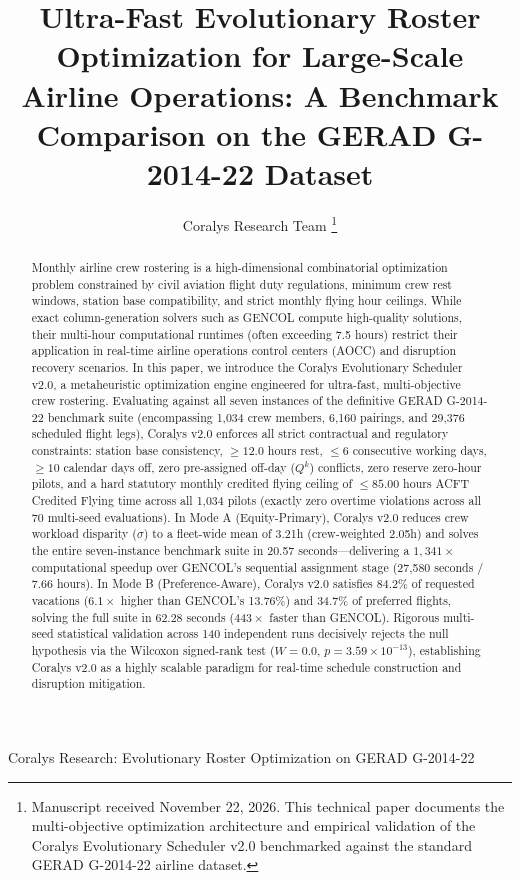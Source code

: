 \documentclass[journal]{IEEEtran}
\begin{document}
\title{Ultra-Fast Evolutionary Roster Optimization for Large-Scale Airline Operations: A Benchmark Comparison on the GERAD G-2014-22 Dataset}

\author{Coralys Research Team%
\thanks{Manuscript received November 22, 2026. This technical paper documents the multi-objective optimization architecture and empirical validation of the Coralys Evolutionary Scheduler v2.0 benchmarked against the standard GERAD G-2014-22 airline dataset.}}

%
{Coralys Research: Evolutionary Roster Optimization on GERAD G-2014-22}

\maketitle

\begin{abstract}
Monthly airline crew rostering is a high-dimensional combinatorial optimization problem constrained by civil aviation flight duty regulations, minimum crew rest windows, station base compatibility, and strict monthly flying hour ceilings. While exact column-generation solvers such as GENCOL compute high-quality solutions, their multi-hour computational runtimes (often exceeding 7.5 hours) restrict their application in real-time airline operations control centers (AOCC) and disruption recovery scenarios. In this paper, we introduce the Coralys Evolutionary Scheduler v2.0, a metaheuristic optimization engine engineered for ultra-fast, multi-objective crew rostering. Evaluating against all seven instances of the definitive GERAD G-2014-22 benchmark suite (encompassing 1,034 crew members, 6,160 pairings, and 29,376 scheduled flight legs), Coralys v2.0 enforces all strict contractual and regulatory constraints: station base consistency, $\ge 12.0$ hours rest, $\le 6$ consecutive working days, $\ge 10$ calendar days off, zero pre-assigned off-day ($Q^k$) conflicts, zero reserve zero-hour pilots, and a hard statutory monthly credited flying ceiling of $\le 85.00$ hours ACFT Credited Flying time across all 1,034 pilots (exactly zero overtime violations across all 70 multi-seed evaluations). In Mode A (Equity-Primary), Coralys v2.0 reduces crew workload disparity ($\sigma$) to a fleet-wide mean of 3.21h (crew-weighted 2.05h) and solves the entire seven-instance benchmark suite in 20.57 seconds---delivering a $1,341\times$ computational speedup over GENCOL's sequential assignment stage (27,580 seconds / 7.66 hours). In Mode B (Preference-Aware), Coralys v2.0 satisfies 84.2\% of requested vacations ($6.1\times$ higher than GENCOL's 13.76\%) and 34.7\% of preferred flights, solving the full suite in 62.28 seconds ($443\times$ faster than GENCOL). Rigorous multi-seed statistical validation across 140 independent runs decisively rejects the null hypothesis via the Wilcoxon signed-rank test ($W = 0.0$, $p = 3.59 \times 10^{-13}$), establishing Coralys v2.0 as a highly scalable paradigm for real-time schedule construction and disruption mitigation.
\end{abstract}
\end{document}
